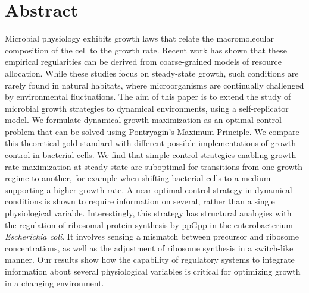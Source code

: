 \section*{Abstract}
Microbial physiology exhibits growth laws that relate the macromolecular composition of the cell to the growth rate.
Recent work has shown that these empirical regularities can be derived from coarse-grained models of resource allocation.
While these studies focus on steady-state growth, such conditions are rarely found in natural habitats, where microorganisms are continually challenged by environmental fluctuations.
The aim of this paper is to extend the study of microbial growth strategies to dynamical environments, using a self-replicator model.
We formulate dynamical growth maximization as an optimal control problem that can be solved using Pontryagin’s Maximum Principle.
We compare this theoretical gold standard with different possible implementations of growth control in bacterial cells.
We find that simple control strategies enabling growth-rate maximization at steady state are suboptimal for transitions from one growth regime to another, for example when shifting bacterial cells to a medium supporting a higher growth rate.
A near-optimal control strategy in dynamical conditions is shown to require information on several, rather than a single physiological variable.
Interestingly, this strategy has structural analogies with the regulation of ribosomal protein synthesis by ppGpp in the enterobacterium \textit{Escherichia coli}.
It involves sensing a mismatch between precursor and ribosome concentrations, as well as the adjustment of ribosome synthesis in a switch-like manner.
Our results show how the capability of regulatory systems to integrate information about several physiological variables is critical for optimizing growth in a changing environment.